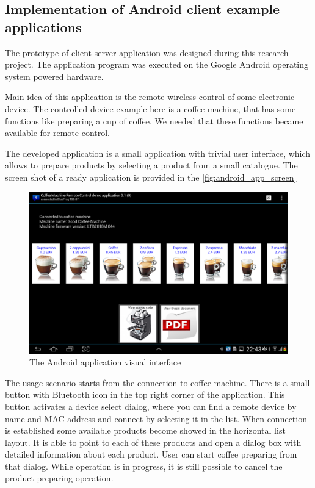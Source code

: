 \subsection{Implementation of Android client example applications}

The prototype of client-server application was designed during this research project.
The application program was executed on the Google Android operating system powered hardware.


Main idea of this application is the remote wireless control of some electronic device. 
The controlled device example here is a coffee machine, that has some functions like preparing a cup of coffee.
We needed that these functions became available for remote control.

The developed application is a small application with trivial user interface, which allows to prepare products by selecting a product from a small catalogue. 
The screen shot of a ready application is provided  in the \autoref{fig:android_app_screen}

\begin{center}
 \begin{figure}[h]
	\includegraphics[width=\textwidth]{../images/implementation/android_app_screen.png}
	\caption{The Android application visual interface }
	\label{fig:android_app_screen}
 \end{figure}
\end{center}

The usage scenario starts from the connection to coffee machine.
There is a small button with Bluetooth icon in the top right corner of the application.
This button activates a device select dialog, where you can find a remote device by name and MAC address and connect by selecting it in the list.
When connection is established some available products become showed in the horizontal list layout.
It is able to point to each of these products and open a dialog box with detailed information about each product.
User can start coffee preparing from that dialog.
While operation is in progress, it is still possible to cancel the product preparing operation.

